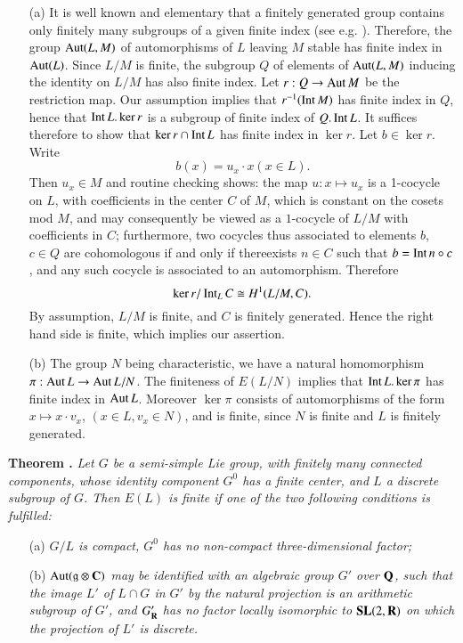 \begin{itemize}
\item[(a)] It is well known and elementary that a finitely generated group contains only finitely many subgroups of a given finite index (see e.g. \cite{art04-key11}). Therefore, the group $\operatorname{\mathrm{Aut}} (L,M)$ of automorphisms of $L$ leaving $M$ stable has finite index in $\operatorname{\mathrm{Aut}}(L)$. Since $L/M$ is finite, the subgroup $Q$ of elements of $\operatorname{\mathrm{Aut}}(L,M)$ inducing the identity on $L/M$ has also finite index. Let $r:Q\to \operatorname{\mathrm{Aut}} M$ be the restriction map. Our assumption implies that $r^{-1}(\operatorname{\mathrm{Int}} M)$ has finite index in $Q$, hence that $\operatorname{\mathrm{Int}} L. \ker r$ is a subgroup of finite index of $Q. \operatorname{\mathrm{Int}} L$. It suffices therefore to show that $\ker r\cap \operatorname{\mathrm{Int}} L$ has finite index in $\ker r$. Let $b\in \ker r$. Write
$$
b(x)=u_{x}\cdot x(x\in L).
$$
Then $u_{x}\in M$ and routine checking shows: the map $u:x\mapsto u_{x}$ is a 1-cocycle on $L$, with coefficients in the center $C$ of $M$, which is constant on the cosets mod $M$, and may consequently be viewed as a $1$-cocycle of $L/M$ with coefficients in $C$; furthermore, two cocycles thus associated to elements $b$, $c\in Q$ are cohomologous if and only if there\pageoriginale exists $n\in C$ such that $b=\operatorname{\mathrm{Int}} n\circ c$, and any such cocycle is associated to an automorphism. Therefore
$$
\ker r/\operatorname{\mathrm{Int}}_{L}C\cong H^{1}(L/M,C).
$$
By assumption, $L/M$ is finite, and $C$ is finitely generated. Hence the right hand side is finite, which implies our assertion.

\item[(b)] The group $N$ being characteristic, we have a natural homomorphism $\pi:\operatorname{\mathrm{Aut}} L\to \operatorname{\mathrm{Aut}} L/N$. The finiteness of $E(L/N)$ implies that $\operatorname{\mathrm{Int}} L.\ker \pi$ has finite index in $\operatorname{\mathrm{Aut}} L$. Moreover $\ker \pi$ consists of automorphisms of the form $x\mapsto x\cdot v_{x}$, $(x\in L, v_{x}\in N)$, and is finite, since $N$ is finite and $L$ is finitely generated.
\end{itemize}

\medskip
\noindent
{\bf Theorem .\label{art04-thm1.5}}
{\em Let $G$ be a semi-simple Lie group, with finitely many connected components, whose identity component $G^{0}$ has a finite center, and $L$ a discrete subgroup of $G$. Then $E(L)$ is finite if one of the two following conditions is fulfilled:}
\begin{itemize}
\item[{\rm(a)}] {\em $G/L$ is compact, $G^{0}$ has no non-compact three-dimensional factor;}

\item[{\rm(b)}] {\em $\operatorname{\mathrm{Aut}}(\mathfrak{g}\otimes \mathbf{C})$ may be identified with an algebraic group $G'$ over $\mathbf{Q}$, such that the image $L'$ of $L\cap G$ in $G'$ by the natural projection is an arithmetic subgroup of $G'$, and $G'_{\mathbf{R}}$ has no factor locally isomorphic to $\mathbf{SL}(2,\mathbf{R})$ on which the projection of $L'$ is discrete.}
\end{itemize}

